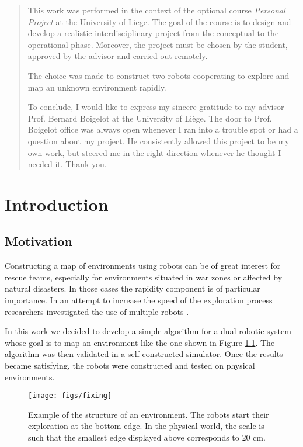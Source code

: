 \documentclass[12pt]{report}
\begin{document}
\renewcommand{\abstractname}{Foreword}
\begin{abstract}
This work was performed in the context of the optional course \textit{Personal Project} at the University of Liege. The goal of the course is to design and develop a realistic interdisciplinary project from the conceptual to the operational phase. Moreover, the project must be chosen by the student, approved by the advisor and carried out remotely. 

The choice was made to construct two robots cooperating to explore and map an unknown environment rapidly.

To conclude, I would like to express my sincere gratitude to my advisor Prof. Bernard Boigelot at the University of Liège. The door to Prof. Boigelot office was always open whenever I ran into a trouble spot or had a question about my project. He consistently allowed this project to be my own work, but steered me in the right direction whenever he thought I needed it. Thank you.
\end{abstract}
\tableofcontents
\clearpage
{}
\chapter{Introduction}
\section{Motivation}
Constructing a map of environments using robots can be of great interest for rescue teams, especially for environments situated in war zones or affected by natural disasters. In those cases the rapidity component is of particular importance. In an attempt to increase the speed of the exploration process researchers investigated the use of multiple robots \cite{burgard, kurt}.

In this work we decided to develop a simple algorithm for a dual robotic system whose goal is to map an environment like the one shown in Figure \ref{fig:env}. The algorithm was then validated in a self-constructed simulator. Once the results became satisfying, the robots were constructed and tested on physical environments.

\begin{figure}[!h]
\vspace*{4mm}
\centering
\texttt{[image: figs/fixing]}
\caption{Example of the structure of an environment. The robots start their exploration at the bottom edge. In the physical world, the scale is such that the smallest edge displayed above corresponds to 20 cm.}
\label{fig:env}
\end{figure}
\end{document}
